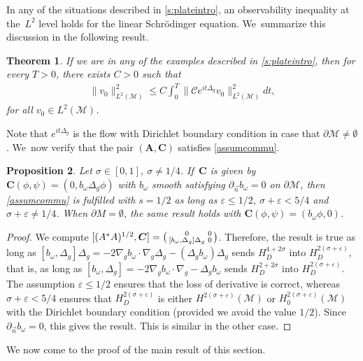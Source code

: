 \documentclass[JEP,XML,SOM,Unicode,published]{cedram}
\newtheorem{theorem}{Theorem}[section]
\newtheorem{proposition}[theorem]{Proposition}
\theoremstyle{definition}
\let\mc\mathcal
\let\veps\varepsilon
\newcommand{\M}{\mc{M}}
\newcommand{\bC}{\boldsymbol{C}}
\newcommand{\bA}{\boldsymbol{A}}
\providecommand{\norm}[1]{\lVert#1\rVert}
\begin{document}
In any of the situations described in \cref{s:plateintro}, an observability inequality at the~$ L^2$ level holds for the linear Schrödinger equation. We~summarize this discussion in the following result.

\begin{theorem}\label{thm:schr-obs}
If we are in any of the examples described in \cref{s:plateintro}, then for every $T>0$, there exists $C>0$ such that
\begin{align*}
\norm{v_0}_{L^2(\M)}^2\leq C\int_0^T \norm{\mc{C} e^{it\Delta_g}v_0}_{L^2(\M)}^2dt,
\end{align*}
for all $v_0\in L^2(\M)$.
\end{theorem}
Note that $e^{it\Delta_g}$ is the flow with Dirichlet boundary condition in case that $\partial \M\neq \emptyset$. We~now verify that the pair $(\bA, \bC)$ satisfies \cref{assumcommu}.
\begin{proposition}\label{propcommutplate}
Let $\sigma\in [0, 1]$, $\sigma \neq 1/4$. If~$\bC$ is given by $ \bC(\phi, \psi)=(0, b_\omega\Delta_g \phi)$ with $b_{\omega}$ smooth satisfying $\partial_{\vec n}b_{\omega}=0$ on $\partial \M$, then \cref{assumcommu} is fulfilled with $s=1/2$ as long as $\veps\leq 1/2$, $\sigma+\veps<5/4$ and $\sigma+\veps\neq 1/4$. When $\partial M=\emptyset$, the same result holds with $ \bC(\phi, \psi)=(b_\omega\phi,0)$.
\end{proposition}
\begin{proof}
We compute $[(A^*A)^{1/2},\bC]=\begin{psmallmatrix}
0 & 0\\
[b_{\omega},\Delta_g] \Delta_g & 0
\end{psmallmatrix}$. Therefore, the result is true as long as $[b_{\omega},\Delta_g]\Delta_g=-2\nabla_g b_{\omega}\cdot \nabla_g \Delta_g-(\Delta_g b_{\omega})\Delta_g$ sends $H^{4+2\sigma}_D$ into $H^{2(\sigma+\veps)}_D$, that is, as long as $[b_{\omega},\Delta_g]=-2\nabla_g b_{\omega}\cdot \nabla_g -\Delta_g b_{\omega}$ sends $H^{2+2\sigma}_D$ into $H^{2(\sigma+\veps)}_D$. The assumption $\veps\leq 1/2$ ensures that the loss of derivative is correct, whereas $\sigma+\veps<5/4$ ensures that $H^{2(\sigma+\veps)}_D$ is either $H^{2(\sigma+\veps)}(\M)$ or $H^{2(\sigma+\veps)}_0(\M)$ with the Dirichlet boundary condition (provided we avoid the value $1/2$). Since $\partial_{\vec n}b_{\omega}=0$, this gives the result. This is similar in the other case.
\end{proof}

We now come to the proof of the main result of this section.
\end{document}
